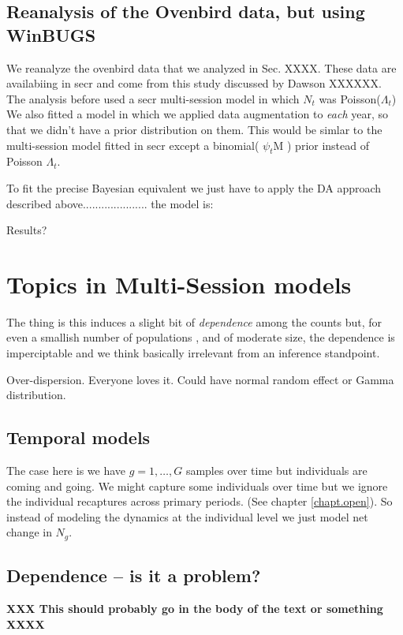 \subsection{Reanalysis of the Ovenbird data, but using WinBUGS}

We reanalyze the ovenbird data that we analyzed in Sec. XXXX. These
data are availabiing in secr and come from this study discussed by
Dawson XXXXXX.
The analysis before used a secr multi-session model in which $N_{t}$
was Poisson($\Lambda_{t}$) We also fitted a model in which we applied
data augmentation to {\it each} year, so that we didn't have a prior
distribution on them.  This would be simlar to the multi-session model
fitted in secr except a binomial( $\psi_{t}$M ) prior instead of
Poisson $\Lambda_{t}$.

To fit the precise Bayesian equivalent we just have to apply the DA
approach described above..................... the model is:

Results?



\section{Topics in Multi-Session models}

The thing is this induces a slight bit of {\it dependence} among the
counts but, for even a smallish number of populations , and of
moderate size, the dependence is imperciptable and we think basically
irrelevant from an inference standpoint. 

Over-dispersion. Everyone loves it. Could have normal random effect or
Gamma distribution. 

\subsection{Temporal models }

The case here is we have $g=1,\ldots,G$ samples over time but
individuals are coming and going.
We might capture some individuals over time but we ignore the
individual recaptures across primary periods. (See chapter
\ref{chapt.open}). So instead of modeling the dynamics at the individual
level we just model net change in $N_{g}$.

\subsection{Dependence -- is it a problem?}

{\bf XXX This should probably go in the body of the text or something XXXX}

